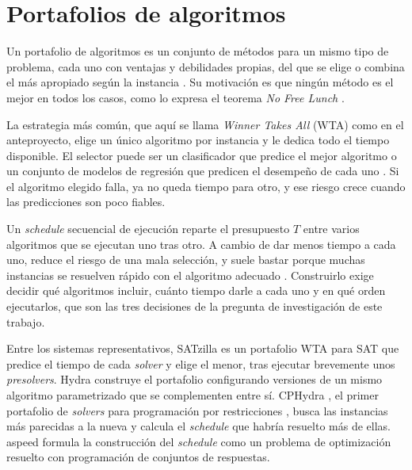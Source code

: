 \section{Portafolios de algoritmos}
\label{sec:portafolios}

Un portafolio de algoritmos es un conjunto de métodos para un mismo tipo de
problema, cada uno con ventajas y debilidades propias, del que se elige o
combina el más apropiado según la instancia \citep{gomes2001, kotthoff2014}. Su
motivación es que ningún método es el mejor en todos los casos, como lo
expresa el teorema \textit{No Free Lunch} \citep{wolpert1997}.

La estrategia más común, que aquí se llama \textit{Winner Takes All} (WTA)
como en el anteproyecto, elige un único algoritmo por instancia y le dedica
todo el tiempo disponible. El selector puede ser un clasificador que predice
el mejor algoritmo o un conjunto de modelos de regresión que predicen el
desempeño de cada uno \citep{xu2008satzilla, kotthoff2014}. Si el algoritmo
elegido falla, ya no queda tiempo para otro, y ese riesgo crece cuando las
predicciones son poco fiables.

Un \textit{schedule} secuencial de ejecución reparte el presupuesto $T$ entre
varios algoritmos que se ejecutan uno tras otro. A cambio de dar menos tiempo
a cada uno, reduce el riesgo de una mala selección, y suele bastar porque
muchas instancias se resuelven rápido con el algoritmo adecuado
\citep{omahony2008cphydra, amadini2014sunny}. Construirlo exige decidir qué
algoritmos incluir, cuánto tiempo darle a cada uno y en qué orden ejecutarlos,
que son las tres decisiones de la pregunta de investigación de este trabajo.

Entre los sistemas representativos, SATzilla \citep{xu2008satzilla} es un
portafolio WTA para SAT que predice el tiempo de cada \textit{solver} y elige
el menor, tras ejecutar brevemente unos \textit{presolvers}. Hydra
\citep{xu2010hydra} construye el portafolio configurando versiones de un
mismo algoritmo parametrizado que se complementen entre sí. CPHydra
\citep{omahony2008cphydra}, el primer portafolio de \textit{solvers} para
programación por restricciones \citep{amadini2015sunnycp}, busca las instancias más parecidas a la nueva
y calcula el \textit{schedule} que habría resuelto más de ellas. aspeed
\citep{hoos2015aspeed} formula la construcción del \textit{schedule} como un
problema de optimización resuelto con programación de conjuntos de
respuestas.

